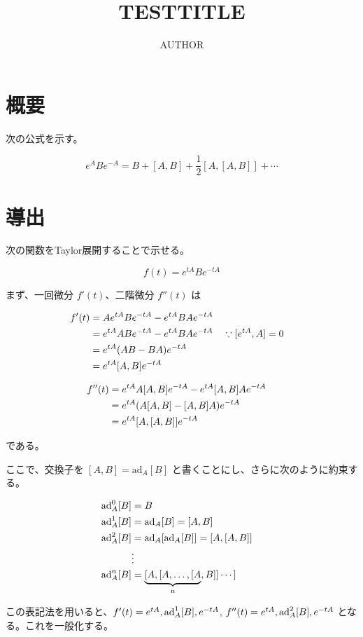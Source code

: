 \documentclass[a4paper, platex]{jsarticle}
\title{TESTTITLE}
\author{AUTHOR}
\begin{document}
\maketitle

\hypertarget{ux6982ux8981}{%
\section{概要}\label{ux6982ux8981}}

次の公式を示す。

\begin{equation}
e^A B e^{-A} = B + [A,B] + \frac{1}{2}[A, [A,B]] + \cdots
\end{equation}

\hypertarget{ux5c0eux51fa}{%
\section{導出}\label{ux5c0eux51fa}}

次の関数をTaylor展開することで示せる。

\begin{equation}
f(t) = e^{tA} B e^{-tA}
\end{equation}

まず、一回微分 \(f'(t)\)、二階微分 \(f''(t)\) は

\begin{align}
f'(t) &= A e^{tA} B e^{-tA} - e^{tA} B A e^{-tA} \cr
  &= e^{tA} A B e^{-tA} - e^{tA} B A e^{-tA} \quad\because [e^{tA}, A] =0 \cr
  &= e^{tA} (AB-BA) e^{-tA} \cr
  &= e^{tA} [A,B] e^{-tA}
\end{align}

\begin{align}
f''(t) &= e^{tA} A [A,B] e^{-tA} - e^{tA} [A,B] A e^{-tA} \cr
  &= e^{tA} (A [A,B] - [A,B] A) e^{-tA} \cr
  &= e^{tA} [A, [A,B]] e^{-tA}
\end{align}

である。

ここで、交換子を \([A,B] = \mathrm{ad}_A [B]\)
と書くことにし、さらに次のように約束する。

\begin{align}
\mathrm{ad}_A^0 [B] &= B \cr
\mathrm{ad}_A^1 [B] &= \mathrm{ad}_A [B] = [A,B] \cr
\mathrm{ad}_A^2 [B] &= \mathrm{ad}_A [\mathrm{ad}_A [B]] = [A, [A, B]] \cr
&\vdots \cr
\mathrm{ad}_A^n [B] &= \underbrace{[A,[A,\ldots,[A}_n,B]]\cdots]
\end{align}

この表記法を用いると、\(f'(t) = e^{tA}\\,\mathrm{ad}_A^1 [B] \\,e^{-tA}\),
\(f''(t) = e^{tA} \\,\mathrm{ad}_A^2 [B] \\,e^{-tA}\)
となる。これを一般化する。
\end{document}
